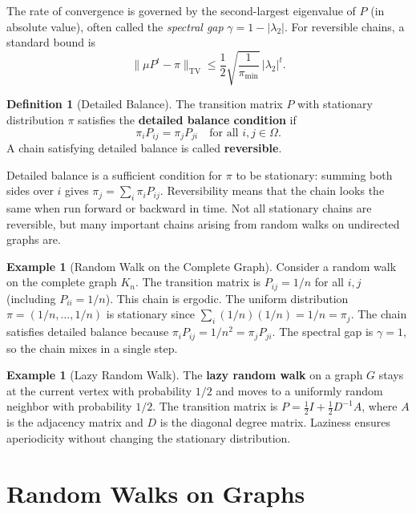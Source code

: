 \documentclass[twoside,12pt]{book}
\theoremstyle{plain}
\theoremstyle{definition}
\newtheorem{definition}[theorem]{Definition}
\newtheorem{example}[theorem]{Example}
\theoremstyle{remark}
\begin{document}
The rate of convergence is governed by the second-largest eigenvalue of
$P$ (in absolute value), often called the \emph{spectral gap}
$\gamma = 1 - |\lambda_2|$. For reversible chains, a standard bound is
\[
    \|\mu P^t - \pi\|_{\mathrm{TV}} \leq \frac{1}{2} \sqrt{\frac{1}{\pi_{\min}}}\, |\lambda_2|^t.
\]

\begin{definition}[Detailed Balance]\label{def:detailed-balance}
The transition matrix $P$ with stationary distribution $\pi$ satisfies
the \textbf{detailed balance condition} if
\[
    \pi_i P_{ij} = \pi_j P_{ji} \quad \text{for all } i, j \in \Omega.
\]
A chain satisfying detailed balance is called \textbf{reversible}.
\end{definition}

Detailed balance is a sufficient condition for $\pi$ to be stationary:
summing both sides over $i$ gives $\pi_j = \sum_i \pi_i P_{ij}$.
Reversibility means that the chain looks the same when run forward or
backward in time. Not all stationary chains are reversible, but many
important chains arising from random walks on undirected graphs are.

\begin{example}[Random Walk on the Complete Graph]\label{ex:rw-complete}
Consider a random walk on the complete graph $K_n$. The transition matrix
is $P_{ij} = 1/n$ for all $i, j$ (including $P_{ii} = 1/n$). This chain
is ergodic. The uniform distribution $\pi = (1/n, \ldots, 1/n)$ is
stationary since $\sum_i (1/n)(1/n) = 1/n = \pi_j$. The chain satisfies
detailed balance because $\pi_i P_{ij} = 1/n^2 = \pi_j P_{ji}$. The
spectral gap is $\gamma = 1$, so the chain mixes in a single step.
\end{example}

\begin{example}[Lazy Random Walk]\label{ex:lazy-rw}
The \textbf{lazy random walk} on a graph $G$ stays at the current vertex
with probability $1/2$ and moves to a uniformly random neighbor with
probability $1/2$. The transition matrix is
$P = \frac{1}{2}I + \frac{1}{2}D^{-1}A$, where $A$ is the adjacency
matrix and $D$ is the diagonal degree matrix. Laziness ensures
aperiodicity without changing the stationary distribution.
\end{example}

\section{Random Walks on Graphs}
\label{sec:rw-graphs}
\end{document}
